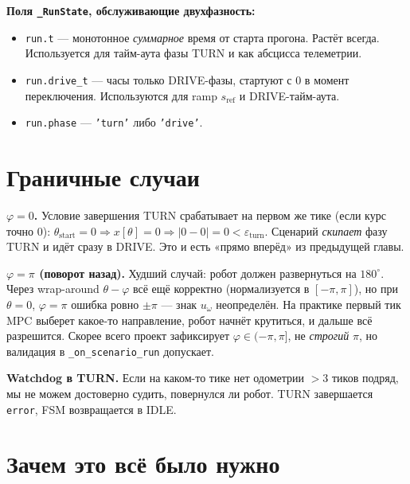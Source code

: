 \textbf{Поля \texttt{\_RunState}, обслуживающие двухфазность:}

\begin{itemize}
  \item \texttt{run.t} --- монотонное \emph{суммарное} время от старта
        прогона. Растёт всегда. Используется для тайм-аута фазы TURN
        и как абсцисса телеметрии.
  \item \texttt{run.drive\_t} --- часы только DRIVE-фазы, стартуют с
        $0$ в момент переключения. Используются для ramp $s_\text{ref}$
        и DRIVE-тайм-аута.
  \item \texttt{run.phase} --- \texttt{'turn'} либо \texttt{'drive'}.
\end{itemize}

\section{Граничные случаи}

\begin{whatifbox}
\textbf{$\varphi = 0$.} Условие завершения TURN срабатывает на первом
же тике (если курс точно $0$): $\theta_\text{start} = 0 \Rightarrow x[\theta]
= 0 \Rightarrow |0 - 0| = 0 < \varepsilon_\text{turn}$. Сценарий
\emph{скипает} фазу TURN и идёт сразу в DRIVE. Это и есть «прямо вперёд»
из предыдущей главы.

\textbf{$\varphi = \pi$ (поворот назад).} Худший случай: робот должен
развернуться на $180^\circ$. Через wrap-around $\theta - \varphi$ всё
ещё корректно (нормализуется в $[-\pi, \pi]$), но при $\theta = 0$,
$\varphi = \pi$ ошибка ровно $\pm\pi$ --- знак $u_\omega$
неопределён. На практике первый тик MPC выберет какое-то направление,
робот начнёт крутиться, и дальше всё разрешится. Скорее всего проект
зафиксирует $\varphi \in (-\pi, \pi]$, не \emph{строгий} $\pi$, но валидация
в \texttt{\_on\_scenario\_run} допускает.

\textbf{Watchdog в TURN.} Если на каком-то тике нет одометрии $> 3$
тиков подряд, мы не можем достоверно судить, повернулся ли робот.
TURN завершается \texttt{error}, FSM возвращается в IDLE.
\end{whatifbox}

\section{Зачем это всё было нужно}

